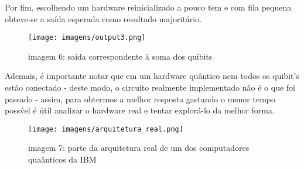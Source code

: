 \documentclass[12pt, a4paper]{article} %
\begin{document}
        Por fim, escolhendo um hardware reinicializado a pouco tem e com fila pequena obteve-se a sa\'ida esperada como resultado majorit\'ario.

        \begin{figure}[H]
        
        \centering
        
        \texttt{[image: imagens/output3.png]}
        
        imagem 6: sa\'ida correspondente \`a soma dos quibits
        
        \end{figure}

        Ademais, \'e importante notar que em um hardware qu\^antico nem todos os quibit's est\~ao conectado - deste modo, o circuito realmente implementado n\~ao \'e o que foi passado - assim, para obtermos a melhor resposta gastando o menor tempo poss\'vel \'e \'util analizar o hardware real e tentar explor\'a-lo da melhor forma.

        \begin{figure}[H]
        
        \centering
        
        \texttt{[image: imagens/arquitetura\_real.png]}
        
        imagem 7: parte da arquitetura real de um dos computadores qua\^anticos da IBM
        
        \end{figure}


        
        
        
        

\end{document}

